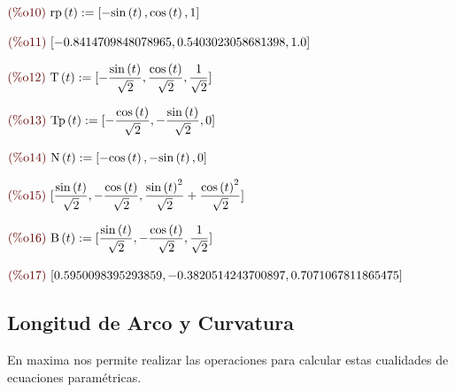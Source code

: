 \documentclass[12pt]{article}
\begin{document}
\begin{math}\displaystyle
\parbox{8ex}{\color{labelcolor}(\%o10) }
\mathrm{rp}\left( t\right) :=[-\mathrm{sin}\left( t\right) ,\mathrm{cos}\left( t\right) ,1]
\end{math}

\begin{math}\displaystyle
\parbox{8ex}{\color{labelcolor}(\%o11) }
[-0.8414709848078965,0.5403023058681398,1.0]
\end{math}

\begin{math}\displaystyle
\parbox{8ex}{\color{labelcolor}(\%o12) }
\mathrm{T}\left( t\right) :=[-\frac{\mathrm{sin}\left( t\right) }{\sqrt{2}},\frac{\mathrm{cos}\left( t\right) }{\sqrt{2}},\frac{1}{\sqrt{2}}]
\end{math}

\begin{math}\displaystyle
\parbox{8ex}{\color{labelcolor}(\%o13) }
\mathrm{Tp}\left( t\right) :=[-\frac{\mathrm{cos}\left( t\right) }{\sqrt{2}},-\frac{\mathrm{sin}\left( t\right) }{\sqrt{2}},0]
\end{math}

\begin{math}\displaystyle
\parbox{8ex}{\color{labelcolor}(\%o14) }
\mathrm{N}\left( t\right) :=[-\mathrm{cos}\left( t\right) ,-\mathrm{sin}\left( t\right) ,0]
\end{math}

\begin{math}\displaystyle
\parbox{8ex}{\color{labelcolor}(\%o15) }
[\frac{\mathrm{sin}\left( t\right) }{\sqrt{2}},-\frac{\mathrm{cos}\left( t\right) }{\sqrt{2}},\frac{{\mathrm{sin}\left( t\right) }^{2}}{\sqrt{2}}+\frac{{\mathrm{cos}\left( t\right) }^{2}}{\sqrt{2}}]
\end{math}

\begin{math}\displaystyle
\parbox{8ex}{\color{labelcolor}(\%o16) }
\mathrm{B}\left( t\right) :=[\frac{\mathrm{sin}\left( t\right) }{\sqrt{2}},-\frac{\mathrm{cos}\left( t\right) }{\sqrt{2}},\frac{1}{\sqrt{2}}]
\end{math}

\begin{math}\displaystyle
\parbox{8ex}{\color{labelcolor}(\%o17) }
[0.5950098395293859,-0.3820514243700897,0.7071067811865475]
\end{math}


\subsection{Longitud de Arco y Curvatura}
En maxima nos permite realizar las operaciones para calcular estas cualidades de ecuaciones paramétricas.
\end{document}
